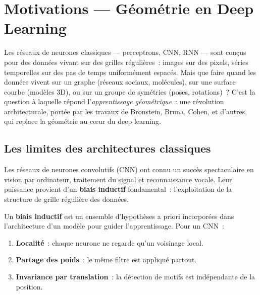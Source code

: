\chapter{Motivations --- G\'eom\'etrie en Deep Learning}
\label{ch:motivations}

Les r\'eseaux de neurones classiques --- perceptrons, CNN, RNN --- sont
con\c{c}us pour des donn\'ees vivant sur des grilles r\'eguli\`eres~: images
sur des pixels, s\'eries temporelles sur des pas de temps uniform\'ement
espac\'es. Mais que faire quand les donn\'ees vivent sur un graphe (r\'eseaux
sociaux, mol\'ecules), sur une surface courbe (mod\`eles 3D), ou sur un
groupe de sym\'etries (poses, rotations)~? C'est la question \`a laquelle
r\'epond l'\emph{apprentissage g\'eom\'etrique}~: une r\'evolution
architecturale, port\'ee par les travaux de Bronstein, Bruna, Cohen, et
d'autres, qui replace la g\'eom\'etrie au c\oe ur du deep learning.

\section{Les limites des architectures classiques}

Les r\'eseaux de neurones convolutifs (CNN) ont connu un succ\`es spectaculaire
en vision par ordinateur, traitement du signal et reconnaissance vocale. Leur
puissance provient d'un \textbf{biais inductif} fondamental~: l'exploitation
de la structure de grille r\'eguli\`ere des donn\'ees.

\begin{definition}
Un \textbf{biais inductif} est un ensemble d'hypoth\`eses a priori incorpor\'ees
dans l'architecture d'un mod\`ele pour guider l'apprentissage. Pour un CNN~:
\begin{enumerate}
    \item \textbf{Localit\'e}~: chaque neurone ne regarde qu'un voisinage local.
    \item \textbf{Partage des poids}~: le m\^eme filtre est appliqu\'e partout.
    \item \textbf{Invariance par translation}~: la d\'etection de motifs est
          ind\'ependante de la position.
\end{enumerate}
\end{definition}

